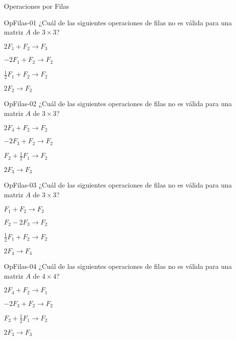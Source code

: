 \documentclass[a4,11pt]{aleph-notas}
\begin{document}
\begin{quiz}{Operaciones por Filas}

\begin{multi}[]%
    {OpFilas-01}
    ¿Cuál de las siguientes operaciones de filas no es válida para una matriz $A$ de $3\times 3$?
    \item* $2F_1+F_2\to F_3$
    \item $-2F_1+F_2\to F_2$
    \item $\frac{1}{2}F_1+F_2\to F_2$
    \item $2F_2\to F_2$
\end{multi}

\begin{multi}[]%
    {OpFilas-02}
    ¿Cuál de las siguientes operaciones de filas no es válida para una matriz $A$ de $3\times 3$?
    \item* $2F_4+F_2\to F_2$
    \item $-2F_3+F_2\to F_2$
    \item $F_2+\frac{1}{2}F_1\to F_2$
    \item $2F_3\to F_3$
\end{multi}

\begin{multi}[]%
    {OpFilas-03}
    ¿Cuál de las siguientes operaciones de filas no es válida para una matriz $A$ de $3\times 3$?
    \item $F_1+F_2\to F_2$
    \item $F_2-2F_3\to F_2$
    \item $\frac{1}{2}F_1+F_2\to F_2$
    \item* $2F_4\to F_4$
\end{multi}

\begin{multi}[]%
    {OpFilas-04}
    ¿Cuál de las siguientes operaciones de filas no es válida para una matriz $A$ de $4\times 4$?
    \item* $2F_4+F_2\to F_1$
    \item $-2F_3+F_2\to F_2$
    \item $F_2+\frac{1}{2}F_1\to F_2$
    \item $2F_3\to F_3$
\end{multi}


\end{quiz}
\end{document}
